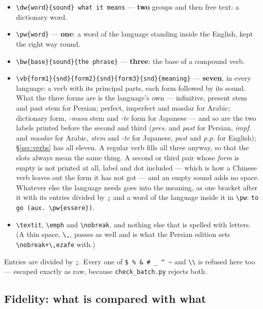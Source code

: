 \documentclass[11pt,oneside]{report}
\newcommand{\pw}[1]{\babelsublr{\mbox{\foreignlanguage{persian}{#1}}}}
\newcommand{\file}[1]{\texttt{#1}}
\begin{document}
\begin{itemize}
\item \verb|\dw{word}{sound} what it means| --- \textbf{two} groups and then
  free text: a dictionary word.
\item \verb|\pw{word}| --- \textbf{one}: a word of the language standing
  inside the English, kept the right way round.
\item \verb|\bw{base}{sound}{the phrase}| --- \textbf{three}: the base of a
  compound verb.
\item \verb|\vb{form1}{snd}{form2}{snd}{form3}{snd}{meaning}| ---
  \textbf{seven}, in every language: a verb with its principal parts, each
  form followed by its sound. What the three forms are is the language's
  own --- infinitive, present stem and past stem for Persian; perfect,
  imperfect and masdar for Arabic; dictionary form, \emph{-masu} stem and
  \emph{-te} form for Japanese --- and so are the two labels printed before
  the second and third (\emph{pres.} and \emph{past} for Persian,
  \emph{impf.} and \emph{masdar} for Arabic, \emph{stem} and \emph{-te} for
  Japanese, \emph{past} and \emph{p.p.} for English); \S\ref{sec:verbs} has
  all eleven. A regular verb fills all three anyway, so that the slots
  always mean the same thing. A second or third pair whose \emph{form} is
  empty is not printed at all, label and dot included --- which is how a
  Chinese verb leaves out the form it has not got --- and an empty sound adds
  no space. Whatever else the
  language needs goes into the meaning, as one bracket after it with its
  entries divided by \texttt{;} and a word of the language inside it in
  \verb|\pw|: \verb|to go (aux. \pw{essere})|.
\item \verb|\textit|, \verb|\emph| and \verb|\nobreak|, and nothing else
  that is spelled with letters. (A thin space, \verb|\,|, passes as well and
  is what the Persian edition sets \verb|\nobreak+\,ezafe| with.)
\end{itemize}

\noindent Entries are divided by \texttt{;}. Every one of
\verb|$ % & # _ ^ ~| and \verb|\\| is refused here too --- escaped exactly as
raw, because \file{check\_batch.py} rejects both.

\subsection*{Fidelity: what is compared with what}
\label{sec:fidelity}
\end{document}
